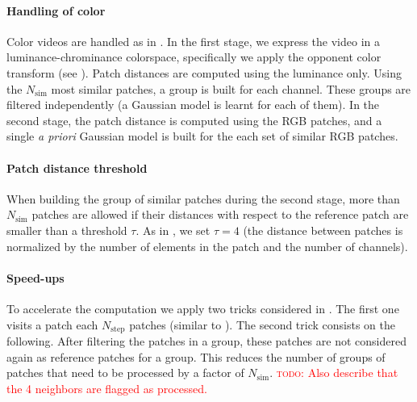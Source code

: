 \documentclass[10pt, journal, twocolumn, final, a4paper]{IEEEtran}
\newcommand{\todo}[1]{\textcolor{red}{\noindent\textsc{todo}: #1}}
\begin{document}
\paragraph{Handling of color} Color videos are handled as in \cite{Lebrun2013a}.
%
In the first stage, we express the video in a luminance-chrominance colorspace,
specifically we apply the opponent color transform (see \cite{Dabov2007tip,Lebrun2013a}).
Patch distances are computed using the luminance only. Using the 
$N_{\text{sim}}$ most similar patches, a group is built for each channel. These
groups are filtered independently (a Gaussian model is learnt for each of them).
%
In the second stage, the patch distance is computed using the RGB patches, and
a single \textit{a priori} Gaussian model is built for the each set
of similar RGB patches. 


\paragraph{Patch distance threshold} When building the group of similar
patches during the second stage, more than $N_{\text{sim}}$ patches are allowed
if their distances with respect to the reference patch are smaller than a
threshold $\tau$.  As in \cite{Lebrun2013ipol}, we set $\tau = 4$ (the distance between
patches is normalized by the number of elements in the patch and the number of
channels).

\paragraph{Speed-ups} To accelerate the computation we apply two tricks
considered in \cite{Lebrun2013ipol}. The first one visits a patch each $N_{\text{step}}$
patches (similar to \cite{Dabov2007tip}). The second trick consists on the following.
After filtering the patches in a group, these patches are not considered again
as reference patches for a group. This reduces the number of groups of patches
that need to be processed by a factor of $N_{\text{sim}}$.
\todo{Also describe that the 4 neighbors are flagged as processed.}
\end{document}
